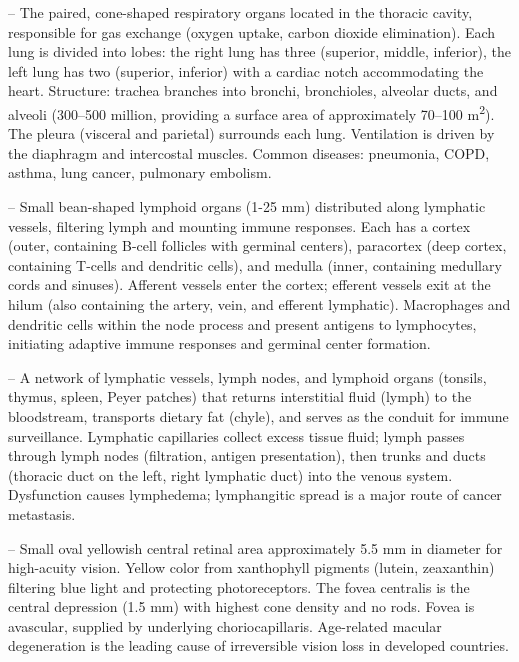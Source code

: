 -- The paired, cone-shaped respiratory organs located in the thoracic cavity, responsible for gas exchange (oxygen uptake, carbon dioxide elimination). Each lung is divided into lobes: the right lung has three (superior, middle, inferior), the left lung has two (superior, inferior) with a cardiac notch accommodating the heart. Structure: trachea branches into bronchi, bronchioles, alveolar ducts, and alveoli (300--500 million, providing a surface area of approximately 70--100 m\textsuperscript{2}). The pleura (visceral and parietal) surrounds each lung. Ventilation is driven by the diaphragm and intercostal muscles. Common diseases: pneumonia, COPD, asthma, lung cancer, pulmonary embolism.

-- Small bean-shaped lymphoid organs (1-25 mm) distributed along lymphatic vessels, filtering lymph and mounting immune responses. Each has a cortex (outer, containing B-cell follicles with germinal centers), paracortex (deep cortex, containing T-cells and dendritic cells), and medulla (inner, containing medullary cords and sinuses). Afferent vessels enter the cortex; efferent vessels exit at the hilum (also containing the artery, vein, and efferent lymphatic). Macrophages and dendritic cells within the node process and present antigens to lymphocytes, initiating adaptive immune responses and germinal center formation.

-- A network of lymphatic vessels, lymph nodes, and lymphoid organs (tonsils, thymus, spleen, Peyer patches) that returns interstitial fluid (lymph) to the bloodstream, transports dietary fat (chyle), and serves as the conduit for immune surveillance. Lymphatic capillaries collect excess tissue fluid; lymph passes through lymph nodes (filtration, antigen presentation), then trunks and ducts (thoracic duct on the left, right lymphatic duct) into the venous system. Dysfunction causes lymphedema; lymphangitic spread is a major route of cancer metastasis.

-- Small oval yellowish central retinal area approximately 5.5 mm in diameter for high-acuity vision. Yellow color from xanthophyll pigments (lutein, zeaxanthin) filtering blue light and protecting photoreceptors. The fovea centralis is the central depression (1.5 mm) with highest cone density and no rods. Fovea is avascular, supplied by underlying choriocapillaris. Age-related macular degeneration is the leading cause of irreversible vision loss in developed countries.

